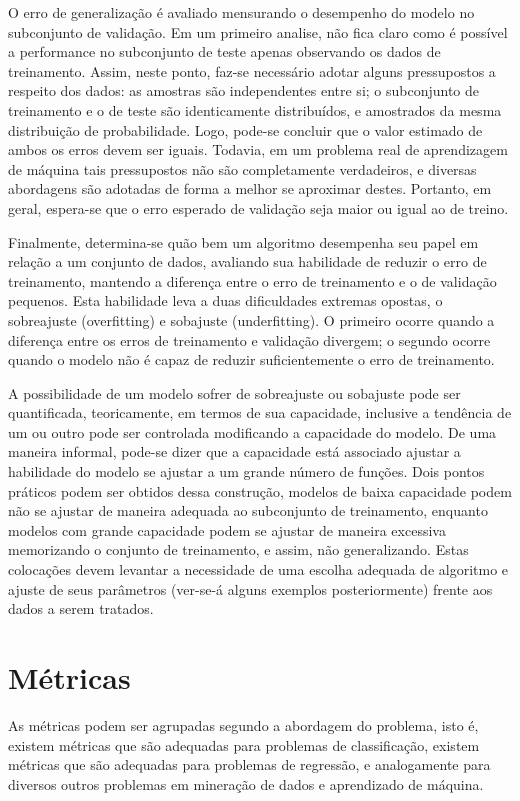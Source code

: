 O erro de generalização é avaliado mensurando o desempenho do modelo no subconjunto de validação. Em um primeiro analise, não fica claro como é possível a performance no subconjunto de teste apenas observando os dados de treinamento. Assim, neste ponto, faz-se necessário adotar alguns pressupostos a respeito dos dados: as amostras são independentes entre si; o subconjunto de treinamento e o de teste são identicamente distribuídos, e amostrados da mesma distribuição de probabilidade. Logo, pode-se concluir que o valor estimado de ambos os erros devem ser iguais. Todavia, em um problema real de aprendizagem de máquina tais pressupostos não são completamente verdadeiros, e diversas abordagens são adotadas de forma a melhor se aproximar destes. Portanto, em geral, espera-se que o erro esperado de validação seja maior ou igual ao de treino.

Finalmente, determina-se quão bem um algoritmo desempenha seu papel em relação a um conjunto de dados, avaliando sua habilidade de reduzir o erro de treinamento, mantendo a diferença entre o erro de treinamento e o de validação pequenos. Esta habilidade leva a duas dificuldades extremas opostas, o sobreajuste (overfitting) e sobajuste (underfitting). O primeiro ocorre quando a diferença entre os erros de treinamento e validação divergem; o segundo ocorre quando o modelo não é capaz de reduzir suficientemente o erro de treinamento.

A possibilidade de um modelo sofrer de sobreajuste ou sobajuste pode ser quantificada, teoricamente, em termos de sua capacidade, inclusive a tendência de um ou outro pode ser controlada modificando a capacidade do modelo. De uma maneira informal, pode-se dizer que a capacidade está associado ajustar a habilidade do modelo se ajustar a um grande número de funções. Dois pontos práticos podem ser obtidos dessa construção, modelos de baixa capacidade podem não se ajustar de maneira adequada ao subconjunto de treinamento, enquanto modelos com grande capacidade podem se ajustar de maneira excessiva memorizando o conjunto de treinamento, e assim, não generalizando. Estas colocações devem levantar a necessidade de uma escolha adequada de algoritmo e ajuste de seus parâmetros (ver-se-á alguns exemplos posteriormente) frente aos dados a serem tratados.

\section{Métricas}

As métricas podem ser agrupadas segundo a abordagem do problema, isto é, existem métricas que são adequadas para problemas de classificação, existem métricas que são adequadas para problemas de regressão, e analogamente para diversos outros problemas em mineração de dados e aprendizado de máquina.


